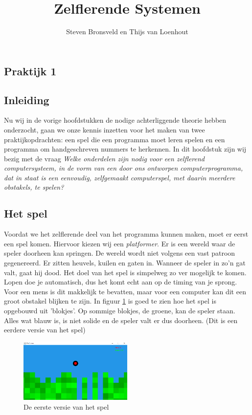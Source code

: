 \documentclass[a4paper,titlepage]{article}
\title{Zelflerende Systemen}
\author{Steven Bronsveld en Thijs van Loenhout}
\begin{document}
\textcolor{praktijk}{
	\section{Praktijk 1}
}


\subsection{Inleiding}
Nu wij in de vorige hoofdstukken de nodige achterliggende theorie hebben onderzocht, gaan we onze kennis inzetten voor het maken van twee praktijkopdrachten: een spel die een programma moet leren spelen en een programma om handgeschreven nummers te herkennen. In dit hoofdstuk zijn wij bezig met de vraag \textit{Welke onderdelen zijn nodig voor een zelflerend computersysteem, in de vorm van een door ons ontworpen computerprogramma, dat in staat is een eenvoudig, zelfgemaakt computerspel, met daarin meerdere obstakels, te spelen?}

\subsection{Het spel}
Voordat we het zelflerende deel van het programma kunnen maken, moet er eerst een spel komen. Hiervoor kiezen wij een \textit{platformer}. Er is een wereld waar de speler doorheen kan springen. De wereld wordt niet volgens een vast patroon gegenereerd. Er zitten heuvels, kuilen en gaten in. Wanneer de speler in zo'n gat valt, gaat hij dood. Het doel van het spel is simpelweg zo ver mogelijk te komen. Lopen doe je automatisch, dus het komt echt aan op de timing van je sprong. Voor een mens is dit makkelijk te bevatten, maar voor een computer kan dit een groot obstakel blijken te zijn.
In figuur \ref{fig:platformer1} is goed te zien hoe het spel is opgebouwd uit 'blokjes'. Op sommige blokjes, de groene, kan de speler staan. Alles wat blauw is, is niet solide en de speler valt er dus doorheen. (Dit is een eerdere versie van het spel)

\begin{figure}[h]
  \centering
    \includegraphics[width=0.5\textwidth]{platformer1.png}
  \caption{De eerste versie van het spel}
  \label{fig:platformer1}
\end{figure}
\end{document}
